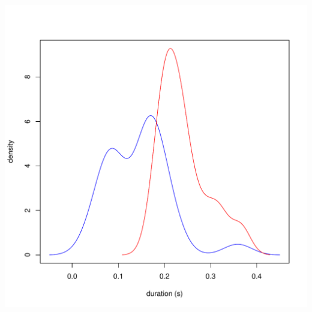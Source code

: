 \documentclass[a4paper,11pt]{article}\usepackage[]{graphicx}\usepackage[]{color}
\makeatletter
\def\maxwidth{ %
  \ifdim\Gin@nat@width>\linewidth
    \linewidth
  \else
    \Gin@nat@width
  \fi
}
\newenvironment{knitrout}{}{} %
\makeatother
\begin{document}
\begin{knitrout}
{\centering \includegraphics[width=\maxwidth]{img/bi-lat-dens-1} 

}



\end{knitrout}
\end{document}
